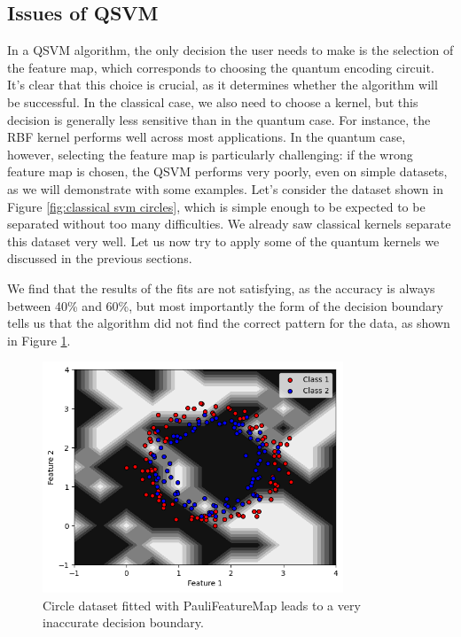 \documentclass[12pt]{article}
\begin{document}
\subsection{Issues of QSVM}

In a QSVM algorithm, the only decision the user needs to make is the selection of the feature map, which corresponds to choosing the quantum encoding circuit. It's clear that this choice is crucial, as it determines whether the algorithm will be successful. In the classical case, we also need to choose a kernel, but this decision is generally less sensitive than in the quantum case. For instance, the RBF kernel performs well across most applications. In the quantum case, however, selecting the feature map is particularly challenging: if the wrong feature map is chosen, the QSVM performs very poorly, even on simple datasets, as we will demonstrate with some examples. Let's consider the dataset shown in Figure \ref{fig:classical svm circles}, which is simple enough to be expected to be separated without too many difficulties. We already saw classical kernels separate this dataset very well. Let us now try to apply some of the quantum kernels we discussed in the previous sections. 

We find that the results of the fits are not satisfying, as the accuracy is always between 40\% and 60\%, but most importantly the form of the decision boundary tells us that the algorithm did not find the correct pattern for the data, as shown in Figure \ref{fig:failcircle}.
\begin{figure}[h!]
    \centering
    \includegraphics[width=0.8\textwidth]{images/failcircle.png}
    \caption{Circle dataset fitted with PauliFeatureMap leads to a very inaccurate decision boundary.}
    \label{fig:failcircle}
\end{figure}
\end{document}
